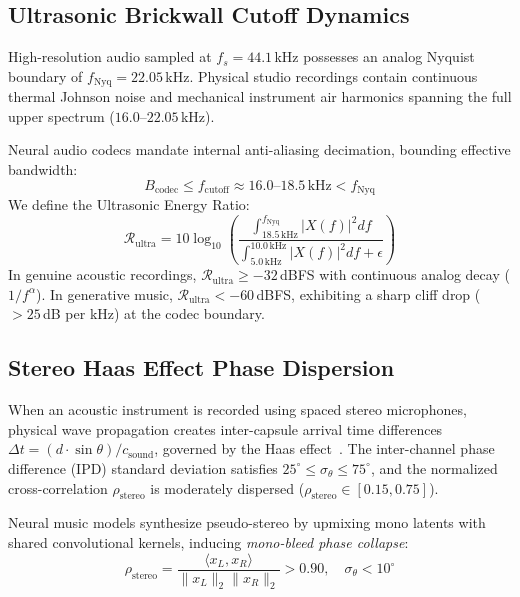 \documentclass[conference]{IEEEtran}
\theoremstyle{definition}
\begin{document}
\subsection{Ultrasonic Brickwall Cutoff Dynamics}
High-resolution audio sampled at $f_s = 44.1$\,kHz possesses an analog Nyquist boundary of $f_{\text{Nyq}} = 22.05$\,kHz. Physical studio recordings contain continuous thermal Johnson noise and mechanical instrument air harmonics spanning the full upper spectrum ($16.0\text{--}22.05$\,kHz).

Neural audio codecs mandate internal anti-aliasing decimation, bounding effective bandwidth:
\begin{equation}
B_{\text{codec}} \le f_{\text{cutoff}} \approx 16.0\text{--}18.5\,\text{kHz} < f_{\text{Nyq}}
\end{equation}
We define the Ultrasonic Energy Ratio:
\begin{equation}
\mathcal{R}_{\text{ultra}} = 10 \log_{10} \left( \frac{\int_{18.5\,\text{kHz}}^{f_{\text{Nyq}}} |X(f)|^2 df}{\int_{5.0\,\text{kHz}}^{10.0\,\text{kHz}} |X(f)|^2 df + \epsilon} \right)
\end{equation}
In genuine acoustic recordings, $\mathcal{R}_{\text{ultra}} \ge -32$\,dBFS with continuous analog decay ($1/f^\alpha$). In generative music, $\mathcal{R}_{\text{ultra}} < -60$\,dBFS, exhibiting a sharp cliff drop ($>25$\,dB per kHz) at the codec boundary.

\subsection{Stereo Haas Effect Phase Dispersion}
When an acoustic instrument is recorded using spaced stereo microphones, physical wave propagation creates inter-capsule arrival time differences $\Delta t = (d \cdot \sin\theta) / c_{\text{sound}}$, governed by the Haas effect~\cite{haas1951influence}. The inter-channel phase difference (IPD) standard deviation satisfies $25^\circ \le \sigma_{\theta} \le 75^\circ$, and the normalized cross-correlation $\rho_{\text{stereo}}$ is moderately dispersed ($\rho_{\text{stereo}} \in [0.15, 0.75]$).

Neural music models synthesize pseudo-stereo by upmixing mono latents with shared convolutional kernels, inducing \textit{mono-bleed phase collapse}:
\begin{equation}
\rho_{\text{stereo}} = \frac{\langle x_L, x_R \rangle}{\|x_L\|_2 \|x_R\|_2} > 0.90, \quad \sigma_\theta < 10^\circ
\end{equation}
\end{document}
